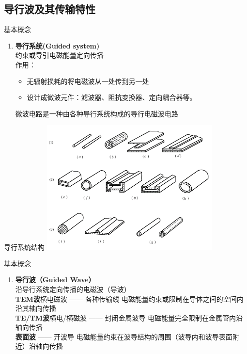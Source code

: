 \subsection{导行波及其传输特性}
\begin{frame}{基本概念}
 \begin{enumerate}
  \item \textbf{导行系统(Guided system)}
        \saveenum
        \\约束或导引电磁能量定向传播\\
        作用：\\
        \begin{itemize}
         \item 无辐射损耗的将电磁波从一处传到另一处
         \item 设计成微波元件：滤波器、阻抗变换器、定向耦合器等。
        \end{itemize}
        微波电路是一种由各种导行系统构成的导行电磁波电路
 \end{enumerate}

\end{frame}

\begin{frame}{导行系统结构}
 \centering
 \includegraphics[width=9cm]{Cha1//guidesystem.png}
\end{frame}

\begin{frame}{基本概念}
 \begin{enumerate}
  \resume
  \item \textbf{导行波（Guided Wave）}
        \\沿导行系统定向传播的电磁波（导波）
        \\\textbf{TEM波}\quad 横电磁波 —— 各种传输线 电磁能量约束或限制在导体之间的空间内沿其轴向传播
        \\\textbf{TE/TM波}\quad 横电/横磁波 —— 封闭金属波导 电磁能量完全限制在金属管内沿轴向传播
        \\\textbf{表面波} —— 开波导 电磁能量约束在波导结构的周围（波导内和波导表面附近）沿轴向传播
        \saveenum
 \end{enumerate}
\end{frame}

